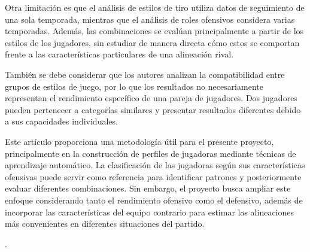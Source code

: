 Otra limitación es que el análisis de estilos de tiro utiliza datos de seguimiento de una sola temporada, mientras que el análisis de roles ofensivos considera varias temporadas. Además, las combinaciones se evalúan principalmente a partir de los estilos de los jugadores, sin estudiar de manera directa cómo estos se comportan frente a las características particulares de una alineación rival.

También se debe considerar que los autores analizan la compatibilidad entre grupos de estilos de juego, por lo que los resultados no necesariamente representan el rendimiento específico de una pareja de jugadores. Dos jugadores pueden pertenecer a categorías similares y presentar resultados diferentes debido a sus capacidades individuales.

Este artículo proporciona una metodología útil para el presente proyecto, principalmente en la construcción de perfiles de jugadoras mediante técnicas de aprendizaje automático. La clasificación de las jugadoras según sus características ofensivas puede servir como referencia para identificar patrones y posteriormente evaluar diferentes combinaciones. Sin embargo, el proyecto busca ampliar este enfoque considerando tanto el rendimiento ofensivo como el defensivo, además de incorporar las características del equipo contrario para estimar las alineaciones más convenientes en diferentes situaciones del partido.

 \cite{yamada2024offensivelineupanalysisbasketball}.
